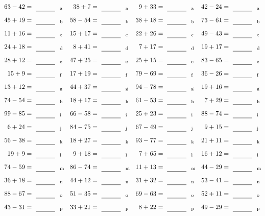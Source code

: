 \documentclass
[
  draft    = true,
  fontsize = 11pt,
  parskip  = half-
]
{scrartcl}
\begin{document}
\clearpage
\begin{align*}
    \pline{63-42}&=\rline{a}
  & \pline{38+7}&=\rline{a}
  & \pline{9+33}&=\rline{a}
  & \pline{42-24}&=\rline{a} \\[1ex]
    \pline{45+19}&=\rline{b}
  & \pline{58-54}&=\rline{b}
  & \pline{38+18}&=\rline{b}
  & \pline{73-61}&=\rline{b} \\[1ex]
    \pline{11+16}&=\rline{c}
  & \pline{15+17}&=\rline{c}
  & \pline{22+26}&=\rline{c}
  & \pline{49-43}&=\rline{c} \\[1ex]
    \pline{24+18}&=\rline{d}
  & \pline{8+41}&=\rline{d}
  & \pline{7+17}&=\rline{d}
  & \pline{19+17}&=\rline{d} \\[1ex]
    \pline{28+12}&=\rline{e}
  & \pline{47+25}&=\rline{e}
  & \pline{25+15}&=\rline{e}
  & \pline{83-65}&=\rline{e} \\[1ex]
    \pline{15+9}&=\rline{f}
  & \pline{17+19}&=\rline{f}
  & \pline{79-69}&=\rline{f}
  & \pline{36-26}&=\rline{f} \\[1ex]
    \pline{13+12}&=\rline{g}
  & \pline{44+37}&=\rline{g}
  & \pline{94-78}&=\rline{g}
  & \pline{19+16}&=\rline{g} \\[1ex]
    \pline{74-54}&=\rline{h}
  & \pline{18+17}&=\rline{h}
  & \pline{61-53}&=\rline{h}
  & \pline{7+29}&=\rline{h} \\[1ex]
    \pline{99-85}&=\rline{i}
  & \pline{66-58}&=\rline{i}
  & \pline{25+23}&=\rline{i}
  & \pline{88-74}&=\rline{i} \\[1ex]
    \pline{6+24}&=\rline{j}
  & \pline{84-75}&=\rline{j}
  & \pline{67-49}&=\rline{j}
  & \pline{9+15}&=\rline{j} \\[1ex]
    \pline{56-38}&=\rline{k}
  & \pline{18+27}&=\rline{k}
  & \pline{93-77}&=\rline{k}
  & \pline{21+11}&=\rline{k} \\[1ex]
    \pline{19+9}&=\rline{l}
  & \pline{9+18}&=\rline{l}
  & \pline{7+65}&=\rline{l}
  & \pline{16+12}&=\rline{l} \\[1ex]
    \pline{74-59}&=\rline{m}
  & \pline{86-74}&=\rline{m}
  & \pline{11+13}&=\rline{m}
  & \pline{44-29}&=\rline{m} \\[1ex]
    \pline{36+18}&=\rline{n}
  & \pline{44+12}&=\rline{n}
  & \pline{31+32}&=\rline{n}
  & \pline{53-41}&=\rline{n} \\[1ex]
    \pline{88-67}&=\rline{o}
  & \pline{51-35}&=\rline{o}
  & \pline{69-63}&=\rline{o}
  & \pline{52+11}&=\rline{o} \\[1ex]
    \pline{43-31}&=\rline{p}
  & \pline{33+21}&=\rline{p}
  & \pline{8+22}&=\rline{p}
  & \pline{49-29}&=\rline{p}
\end{align*}
\end{document}
